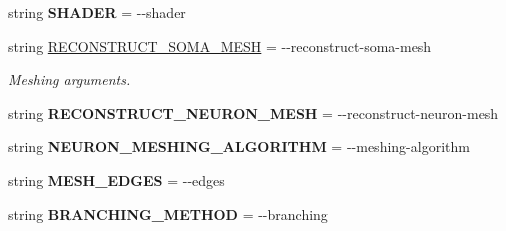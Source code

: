 \begin{DoxyCompactItemize}
\item 
string {\bfseries S\+H\+A\+D\+ER} = \textquotesingle{}-\/-\/shader\textquotesingle{}\hypertarget{classmeshy_1_1neuromorphovis_1_1interface_1_1cli_1_1args_1_1Args_aa9103facef83bbebc6747cbc5d7518d0}{}\label{classmeshy_1_1neuromorphovis_1_1interface_1_1cli_1_1args_1_1Args_aa9103facef83bbebc6747cbc5d7518d0}

\item 
string \hyperlink{classmeshy_1_1neuromorphovis_1_1interface_1_1cli_1_1args_1_1Args_a549d7780133669c801af4e0957825177}{R\+E\+C\+O\+N\+S\+T\+R\+U\+C\+T\+\_\+\+S\+O\+M\+A\+\_\+\+M\+E\+SH} = \textquotesingle{}-\/-\/reconstruct-\/soma-\/mesh\textquotesingle{}
\begin{DoxyCompactList}\small\item\em Meshing arguments. \end{DoxyCompactList}\item 
string {\bfseries R\+E\+C\+O\+N\+S\+T\+R\+U\+C\+T\+\_\+\+N\+E\+U\+R\+O\+N\+\_\+\+M\+E\+SH} = \textquotesingle{}-\/-\/reconstruct-\/neuron-\/mesh\textquotesingle{}\hypertarget{classmeshy_1_1neuromorphovis_1_1interface_1_1cli_1_1args_1_1Args_a6e8485681e92ebafd48fb70c6756ea8b}{}\label{classmeshy_1_1neuromorphovis_1_1interface_1_1cli_1_1args_1_1Args_a6e8485681e92ebafd48fb70c6756ea8b}

\item 
string {\bfseries N\+E\+U\+R\+O\+N\+\_\+\+M\+E\+S\+H\+I\+N\+G\+\_\+\+A\+L\+G\+O\+R\+I\+T\+HM} = \textquotesingle{}-\/-\/meshing-\/algorithm\textquotesingle{}\hypertarget{classmeshy_1_1neuromorphovis_1_1interface_1_1cli_1_1args_1_1Args_a4a363073e3e80fae1ad8874a23b5b7b3}{}\label{classmeshy_1_1neuromorphovis_1_1interface_1_1cli_1_1args_1_1Args_a4a363073e3e80fae1ad8874a23b5b7b3}

\item 
string {\bfseries M\+E\+S\+H\+\_\+\+E\+D\+G\+ES} = \textquotesingle{}-\/-\/edges\textquotesingle{}\hypertarget{classmeshy_1_1neuromorphovis_1_1interface_1_1cli_1_1args_1_1Args_a50a514ee9636909e6e0688e711fe0ffa}{}\label{classmeshy_1_1neuromorphovis_1_1interface_1_1cli_1_1args_1_1Args_a50a514ee9636909e6e0688e711fe0ffa}

\item 
string {\bfseries B\+R\+A\+N\+C\+H\+I\+N\+G\+\_\+\+M\+E\+T\+H\+OD} = \textquotesingle{}-\/-\/branching\textquotesingle{}\hypertarget{classmeshy_1_1neuromorphovis_1_1interface_1_1cli_1_1args_1_1Args_af5e17cd30036eaabef5370f91770dc9a}{}\label{classmeshy_1_1neuromorphovis_1_1interface_1_1cli_1_1args_1_1Args_af5e17cd30036eaabef5370f91770dc9a}


\end{DoxyCompactItemize}
